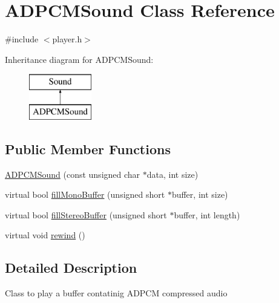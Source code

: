 \hypertarget{class_a_d_p_c_m_sound}{\section{A\-D\-P\-C\-M\-Sound Class Reference}
\label{class_a_d_p_c_m_sound}
}


{\ttfamily \#include $<$player.\-h$>$}

Inheritance diagram for A\-D\-P\-C\-M\-Sound\-:\begin{figure}[H]
\begin{center}
\leavevmode
\includegraphics[height=2.000000cm]{class_a_d_p_c_m_sound}
\end{center}
\end{figure}
\subsection*{Public Member Functions}
\begin{DoxyCompactItemize}
\item 
\hyperlink{class_a_d_p_c_m_sound_a4213786af4c9c618d58955f8e83bfdca}{A\-D\-P\-C\-M\-Sound} (const unsigned char $\ast$data, int size)
\item 
virtual bool \hyperlink{class_a_d_p_c_m_sound_aa4bae7530240f47b76abef5dee718649}{fill\-Mono\-Buffer} (unsigned short $\ast$buffer, int size)
\item 
virtual bool \hyperlink{class_a_d_p_c_m_sound_a04e36f00fa43f9da21bc4bd97a2ddf44}{fill\-Stereo\-Buffer} (unsigned short $\ast$buffer, int length)
\item 
virtual void \hyperlink{class_a_d_p_c_m_sound_ac1c8d4b362dd7803087f82f3b26f6957}{rewind} ()
\end{DoxyCompactItemize}


\subsection{Detailed Description}
Class to play a buffer contatinig A\-D\-P\-C\-M compressed audio 

